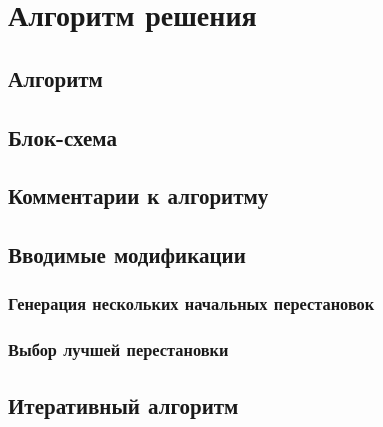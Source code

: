 \chapter{Алгоритм решения}
\section{Алгоритм}
\section{Блок-схема}
\section{Комментарии к алгоритму}
\section{Вводимые модификации}
\subsection{Генерация нескольких начальных перестановок}
\subsection{Выбор лучшей перестановки}
\section{Итеративный алгоритм}